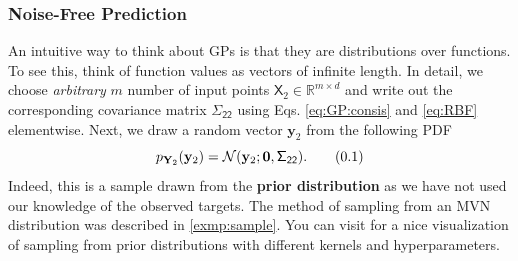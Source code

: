 \documentclass[10pt]{article}
\theoremstyle{definition}
\newcommand\eqnum{\addtocounter{equation}{1}\tag{\arabic{section}.\arabic{equation}}}
\begin{document}
\subsubsection{Noise-Free Prediction}
An intuitive way to think about GPs is that they are distributions over functions. To see this, think of function values as vectors of infinite length. In detail, we choose \textit{arbitrary} $m$ number of input points $\mathsf{X}_2 \in \mathbb{R}^{m\times d}$ and write out the corresponding covariance matrix $\mathsf{\Sigma_{22}}$ using Eqs. \eqref{eq:GP:consis} and \eqref{eq:RBF} elementwise. Next, we draw a random vector $\mathbf{y}_{2}$ from the following PDF
\begin{equation*}
p_{\mathbf{Y}_{2}}(\mathbf{y}_{2}) = \mathcal{N}(\mathbf{y}_{2}; \mathbf{0}, \mathsf{\Sigma_{22}}).
\eqnum
\label{eq:GP:prior}
\end{equation*}
Indeed, this is a sample drawn from the \textbf{prior distribution} as we have not used our knowledge of the observed targets. The method of sampling from an MVN distribution was described in \cref{exmp:sample}. You can visit \cite{Gortler2019} for a nice visualization of sampling from prior distributions with different kernels and hyperparameters. 
\end{document}
